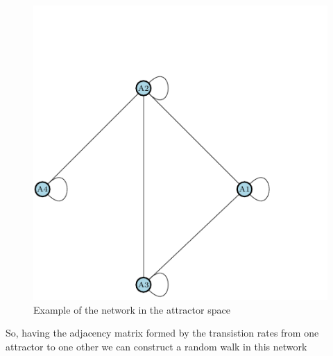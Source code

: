 \documentclass[11pt]{article}
\begin{document}
\begin{figure}[h]
\centering
\includegraphics[scale=1]{fg5.pdf}
\caption{Example of the network in the attractor space}
\label{fig:rb5}
\end{figure}

So, having the adjacency matrix formed by the transistion rates from one attractor to one other we can construct a random walk in this network
\end{document}
